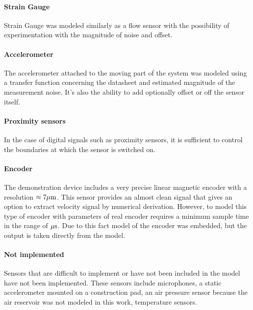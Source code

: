 \paragraph{Strain Gauge}
Strain Gauge was modeled similarly as a flow sensor with the possibility of
experimentation with the magnitude of noise and offset.

\paragraph{Accelerometer}
The accelerometer attached to the moving part of the system was modeled
using a transfer function concerning the datasheet and estimated magnitude
of the measurement noise. It's also the ability to add optionally offset or
off the sensor itself.

\paragraph{Proximity sensors} In the case of digital signals such as
proximity sensors, it is sufficient to control the boundaries at which the
sensor is switched on.


\paragraph{Encoder}
The demonstration device includes a very precise linear magnetic encoder
with a resolution $\approx 7 \rm \mu m$. This sensor provides an almost
clean signal that gives an option to extract velocity signal by numerical
derivation.  However, to model this type of encoder with parameters of real
encoder requires a minimum sample time in the range of $\rm \mu s$. Due to
this fact model of the encoder was embedded, but the output is taken
directly from the model.

\paragraph{Not implemented}

Sensors that are difficult to implement or have not been included in the
model have not been implemented. These sensors include microphones, a
static accelerometer mounted on a construction pad, an air pressure sensor
because the air reservoir was not modeled in this work, temperature
sensors.

